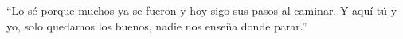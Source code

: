 
\begin{savequote}[0.55\linewidth]
``Lo s\'{e} porque muchos ya se fueron y hoy sigo sus pasos al caminar. Y aqu\'{i} t\'{u} y yo, solo quedamos los buenos, nadie nos ense\~{n}a donde parar.''
\end{savequote}
